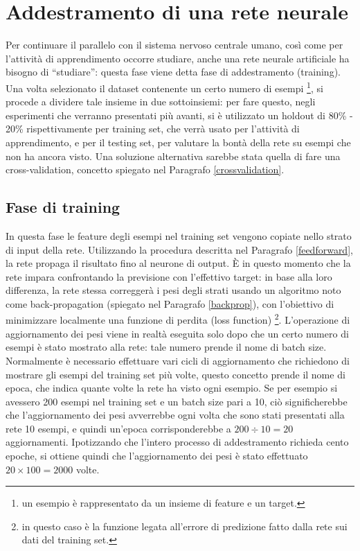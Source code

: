 \documentclass[12pt]{report}
\begin{document}
\section{Addestramento di una rete neurale}
Per continuare il parallelo con il sistema nervoso centrale umano, così come per l'attività di apprendimento occorre studiare, anche una rete neurale artificiale ha bisogno di ``studiare'': questa fase viene detta fase di addestramento (training).
Una volta selezionato il dataset contenente un certo numero di esempi \footnote{un esempio è rappresentato da un insieme di feature e un target.}, si procede a dividere tale insieme in due sottoinsiemi: per fare questo, negli esperimenti che verranno presentati più avanti, si è utilizzato un holdout di 80\% - 20\% rispettivamente per training set, che verrà usato per l'attività di apprendimento, e per il testing set, per valutare la bontà della rete su esempi che non ha ancora visto.
Una soluzione alternativa sarebbe stata quella di fare una cross-validation, concetto spiegato nel Paragrafo \ref{crossvalidation}.

\subsection{Fase di training}
In questa fase le feature degli esempi nel training set vengono copiate nello strato di input della rete. Utilizzando la procedura descritta nel Paragrafo \ref{feedforward}, la rete propaga il risultato fino al neurone di output. È in questo momento che la rete impara confrontando la previsione con l’effettivo target: in base alla loro differenza, la rete stessa correggerà i pesi degli strati usando un algoritmo noto come back-propagation (spiegato nel Paragrafo \ref{backprop}), con l'obiettivo di minimizzare localmente una funzione di perdita \label{loss} (loss function) \footnote{in questo caso è la funzione legata all'errore di predizione fatto dalla rete sui dati del training set.}.
L'operazione di aggiornamento dei pesi viene in realtà eseguita solo dopo che un certo numero di esempi è stato mostrato alla rete: tale numero prende il nome di batch size. Normalmente è necessario effettuare vari cicli di aggiornamento che richiedono di mostrare gli esempi del training set più volte, questo concetto prende il nome di epoca, che indica quante volte la rete ha visto ogni esempio.
Se per esempio si avessero 200 esempi nel training set e un batch size pari a 10, ciò significherebbe che l'aggiornamento dei pesi avverrebbe ogni volta che sono stati presentati alla rete 10 esempi, e
quindi un'epoca corrisponderebbe a $200 \div 10 = 20$ aggiornamenti. Ipotizzando che l'intero processo di addestramento richieda cento epoche, si ottiene quindi che l'aggiornamento dei pesi è stato effettuato $20 \times 100 = 2000$ volte.
\end{document}
